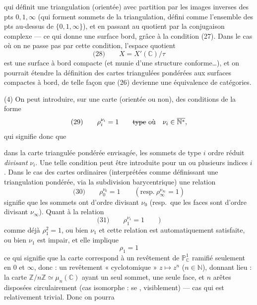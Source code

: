 \documentclass[11pt,a4paper]{article}
\begin{document}
qui définit une triangulation (orientée) avec partition par les images inverses
des pts $0, 1, \infty$  (qui forment  sommets de la triangulation, défini comme l'ensemble des pts
au-dessus de $\{0, 1, \infty\}$), et en passant au quotient par la conjugaison
complexe --- ce qui donne une surface  bord, grâce à la
condition (27). Dans le cas où on ne passe pas par cette condition, l'espace
quotient
\[
  \text{(28)} \qquad X = X'(\mathbb{C}) / \tau
\]
est une surface à bord compacte (et munie d'une structure conforme…), et on
pourrait étendre  la définition des cartes
 triangulées pondérées aux surfaces compactes à bord, de telle façon
que (26) devienne une équivalence de catégories.

(4) On peut introduire, sur une carte (orientée ou non), des conditions de la
forme
\[
  \text{(29)} \qquad \rho_i^{\nu_i} = 1
  \qquad \text{\struck{type}} \ \text{où} \quad
  \nu_i \in \overline{\mathbb{N}^*},
\]
qui signifie donc que

dans la carte triangulée pondérée envisagée, les sommets de type $i$
\struck{\ill{}}  ordre réduit \emph{divisant} $\nu_i$.
Une telle condition peut être introduite pour un ou plusieurs indices $i$. Dans le
cas des cartes ordinaires (interprétées comme définissant une triangulation
pondérée, via la subdivision barycentrique) une relation
\[
  \text{(30)} \qquad \rho_0^{\nu_0} = 1 \qquad
  (\text{resp.}\ \rho_\infty^{\nu_\infty} = 1)
\]
signifie que les sommets \struck{\ill{}} ont d'ordre divisant $\nu_0$
(resp.\ que les faces sont d'ordre divisant $\nu_\infty$). Quant à la relation
\[
  \text{(31)} \qquad \rho_1^{\nu_1} = 1 \qquad )
\]
comme \ill{} déjà $\rho_1^2 = 1$, ou bien $\nu_1$ 
et cette relation est automatiquement satisfaite, ou bien $\nu_1$ est impair, et
elle implique
\[
  \rho_1 = 1
\]
ce qui signifie que la carte correspond à un revêtement de $\mathbb{P}^1_{\mathbb{C}}$
ramifié seulement en $0$ et $\infty$, donc : un revêtement « cyclotomique »
$z \mapsto z^n$ ($n \in \mathbb{N}$),  donnant lieu : la carte
  
$\mathbb{Z}/n\mathbb{Z} \simeq \mu_n(\mathbb{C})$ ayant un seul sommet, une seule
face, et $n$ arêtes disposées circulairement (cas \ill{} isomorphe : se
, visiblement) --- cas qui est relativement trivial. Donc on
pourra
\end{document}
